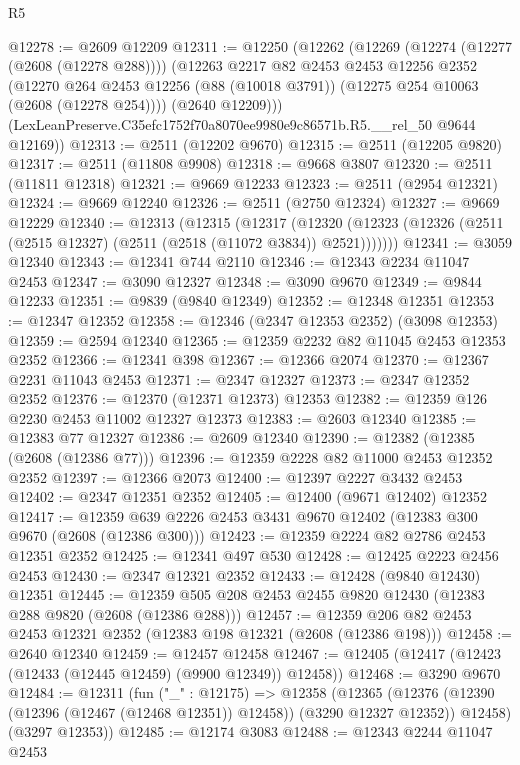 \begin{lexlean}{R5}
\begin{coremodule}
@12278 := @2609 @12209
@12311 := @12250
    (@12262
      (@12269
        (@12274 (@12277 (@2608 (@12278 @288))))
        (@12263
          @2217
          @82
          @2453
          @2453
          @12256
          @2352
          (@12270 @264 @2453 @12256 (@88 (@10018 @3791)) (@12275 @254 @10063 (@2608 (@12278 @254))))
          (@2640 @12209)))
      (LexLeanPreserve.C35efc1752f70a8070ee9980e9c86571b.R5.__rel_50 @9644 @12169))
@12313 := @2511 (@12202 @9670)
@12315 := @2511 (@12205 @9820)
@12317 := @2511 (@11808 @9908)
@12318 := @9668 @3807
@12320 := @2511 (@11811 @12318)
@12321 := @9669 @12233
@12323 := @2511 (@2954 @12321)
@12324 := @9669 @12240
@12326 := @2511 (@2750 @12324)
@12327 := @9669 @12229
@12340 := @12313
    (@12315
      (@12317
        (@12320 (@12323 (@12326 (@2511 (@2515 @12327) (@2511 (@2518 (@11072 @3834)) @2521)))))))
@12341 := @3059 @12340
@12343 := @12341 @744 @2110
@12346 := @12343 @2234 @11047 @2453
@12347 := @3090 @12327
@12348 := @3090 @9670
@12349 := @9844 @12233
@12351 := @9839 (@9840 @12349)
@12352 := @12348 @12351
@12353 := @12347 @12352
@12358 := @12346 (@2347 @12353 @2352) (@3098 @12353)
@12359 := @2594 @12340
@12365 := @12359 @2232 @82 @11045 @2453 @12353 @2352
@12366 := @12341 @398
@12367 := @12366 @2074
@12370 := @12367 @2231 @11043 @2453
@12371 := @2347 @12327
@12373 := @2347 @12352 @2352
@12376 := @12370 (@12371 @12373) @12353
@12382 := @12359 @126 @2230 @2453 @11002 @12327 @12373
@12383 := @2603 @12340
@12385 := @12383 @77 @12327
@12386 := @2609 @12340
@12390 := @12382 (@12385 (@2608 (@12386 @77)))
@12396 := @12359 @2228 @82 @11000 @2453 @12352 @2352
@12397 := @12366 @2073
@12400 := @12397 @2227 @3432 @2453
@12402 := @2347 @12351 @2352
@12405 := @12400 (@9671 @12402) @12352
@12417 := @12359 @639 @2226 @2453 @3431 @9670 @12402 (@12383 @300 @9670 (@2608 (@12386 @300)))
@12423 := @12359 @2224 @82 @2786 @2453 @12351 @2352
@12425 := @12341 @497 @530
@12428 := @12425 @2223 @2456 @2453
@12430 := @2347 @12321 @2352
@12433 := @12428 (@9840 @12430) @12351
@12445 := @12359 @505 @208 @2453 @2455 @9820 @12430 (@12383 @288 @9820 (@2608 (@12386 @288)))
@12457 := @12359 @206 @82 @2453 @2453 @12321 @2352 (@12383 @198 @12321 (@2608 (@12386 @198)))
@12458 := @2640 @12340
@12459 := @12457 @12458
@12467 := @12405 (@12417 (@12423 (@12433 (@12445 @12459) (@9900 @12349)) @12458))
@12468 := @3290 @9670
@12484 := @12311
    (fun ("_" : @12175) =>
    @12358
      (@12365
        (@12376 (@12390 (@12396 (@12467 (@12468 @12351)) @12458)) (@3290 @12327 @12352))
        @12458)
      (@3297 @12353))
@12485 := @12174 @3083
@12488 := @12343 @2244 @11047 @2453

\end{coremodule}
\end{lexlean}
